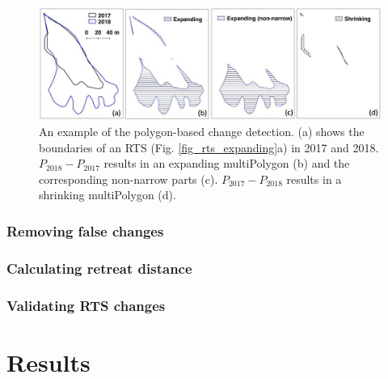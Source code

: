 \documentclass[authoryear,preprint,review,12pt]{elsarticle}
\begin{document}
\begin{figure} 
	\centering
	\includegraphics[width=14cm]{figs/rts_polygon_change_det_trim}
	\caption{An example of the polygon-based change detection. (a) shows the boundaries of an RTS (Fig. \ref{fig_rts_expanding}a) in 2017 and 2018. $P_{2018}-P_{2017}$ results in an expanding multiPolygon (b) and the corresponding non-narrow parts (c). $P_{2017}-P_{2018}$ results in a shrinking multiPolygon (d).}
	\label{fig_rts_change_det}
\end{figure}


\subsubsection{Removing false changes}
\label{sec_removing_false_change}



\subsubsection{Calculating retreat distance}
\label{sec_cal_retreat_dis}



\subsubsection{Validating RTS changes}
\label{sec_validation_change}



\section{Results}
\label{sec_result}
\end{document}
